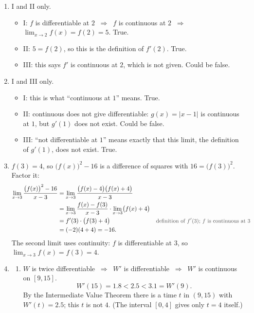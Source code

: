 \documentclass[11pt,a4paper]{article}
\newcounter{example}
\newcommand{\why}[1]{\text{\small\color{darkgray}#1}}
\newcommand{\imp}{\ \Longrightarrow\ }
\begin{document}
\begin{examplesolution}
\relax
\begin{enumerate}[label=(\alph*)]
 \item I and II only.
 \begin{itemize}
  \item I: $f$ is differentiable at $2$ $\imp$ $f$ is continuous at $2$ $\imp$ $\displaystyle\lim_{x\to2}f(x)=f(2)=5$. True.
  \item II: $5=f(2)$, so this is the definition of $f'(2)$. True.
  \item III: this says $f'$ is continuous at $2$, which is not given. Could be false.
 \end{itemize}
 \item I and III only.
 \begin{itemize}
  \item I: this is what ``continuous at $1$'' means. True.
  \item II: continuous does not give differentiable: $g(x)=|x-1|$ is continuous at $1$, but $g'(1)$ does not exist. Could be false.
  \item III: ``not differentiable at $1$'' means exactly that this limit, the definition of $g'(1)$, does not exist. True.
 \end{itemize}
 \item $f(3)=4$, so $\bigl(f(x)\bigr)^2-16$ is a difference of squares with $16=\bigl(f(3)\bigr)^2$. Factor it:
 \begin{align*}
 \lim_{x\to3}\frac{\bigl(f(x)\bigr)^2-16}{x-3}&=\lim_{x\to3}\frac{\bigl(f(x)-4\bigr)\bigl(f(x)+4\bigr)}{x-3}\\
 &=\lim_{x\to3}\frac{f(x)-f(3)}{x-3}\cdot\lim_{x\to3}\bigl(f(x)+4\bigr)\\
 &=f'(3)\cdot\bigl(f(3)+4\bigr) &&\why{definition of $f'(3)$; $f$ is continuous at $3$}\\
 &=(-2)(4+4)=-16.
 \end{align*}
 The second limit uses continuity: $f$ is differentiable at $3$, so $\displaystyle\lim_{x\to3}f(x)=f(3)=4$.
 \item
 \begin{enumerate}[label=(\roman*)]
  \item $W$ is twice differentiable $\imp$ $W'$ is differentiable $\imp$ $W'$ is continuous on $[9,15]$.
  \[
  W'(15)=1.8<2.5<3.1=W'(9).
  \]
  By the Intermediate Value Theorem there is a time $t$ in $(9,15)$ with $W'(t)=2.5$; this $t$ is not $4$. (The interval $[0,4]$ gives only $t=4$ itself.)
\begin{center}

\end{center}
\end{enumerate}
\end{enumerate}
\end{examplesolution}
\end{document}
